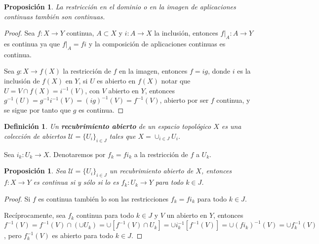 \documentclass[12pt]{article}
\newtheorem{proposition}[theorem]{Proposición}
\newtheorem{definition}[theorem]{Definición}
\begin{document}
\begin{proposition}La restricción en el dominio o en la imagen de aplicaciones continuas también son continuas.
\end{proposition}
\begin{proof}
Sea $f \colon X \longrightarrow Y$ continua, $A \subset X$ y $i \colon A \longrightarrow X$ la inclusión, entonces $\left.f \right|_A \colon A \longrightarrow Y$ es continua ya que $\left.f \right|_A = fi$ y la composición de aplicaciones continuas es continua. 

Sea $g \colon X \longrightarrow f(X)$ la restricción de $f$ en la imagen, entonces $f = ig$, donde $i$ es la inclusión de $f(X)$ en $Y$, si $U$ es abierto en $f(X)$ notar que $U = V \cap f(X) = i^{-1}(V)$, con $V$ abierto en $Y$, entonces $g^{-1}(U) = g^{-1}i^{-1}(V) = (ig)^{-1}(V) = f^{-1}(V)$, abierto por ser $f$ continua, y se sigue por tanto que $g$ es continua.

\end{proof}

\begin{definition}Un \textbf{recubrimiento abierto} de un espacio topológico $X$ es una colección de abiertos $\mathcal{U} = \lbrace U_i \rbrace_{i \in J}$ tales que $X = \cup_{i \in J}U_i$.  
\end{definition}

Sea $i_k \colon U_k \longrightarrow X$. Denotaremos por $f_k = fi_k$ a la restricción de $f$ a $U_k$.

\begin{proposition}Sea $\mathcal{U} = \lbrace U_i \rbrace_{i\in J}$ un recubrimiento abierto de $X$, entonces $f\colon X \longrightarrow Y$ es continua si y sólo si lo es $f_k \colon U_k \longrightarrow Y$ para todo $k \in J$.
\end{proposition}
\begin{proof}
Si $f$ es continua también lo son las restricciones $f_k = fi_k$ para todo $k \in J$.

Recíprocamente, sea $f_k$ continua para todo $k \in J$ y $V$ un abierto en $Y$, entonces $f^{-1}(V) = f^{-1}(V) \cap (\cup U_k) = \cup [f^{-1}(V) \cap U_k] = \cup i_k^{-1}[f^{-1}(V)] = \cup (fi_k)^{-1}(V) = \cup f_k^{-1}(V)$, pero $f_k^{-1}(V)$ es abierto para todo $k \in J$.
\end{proof}
\end{document}
